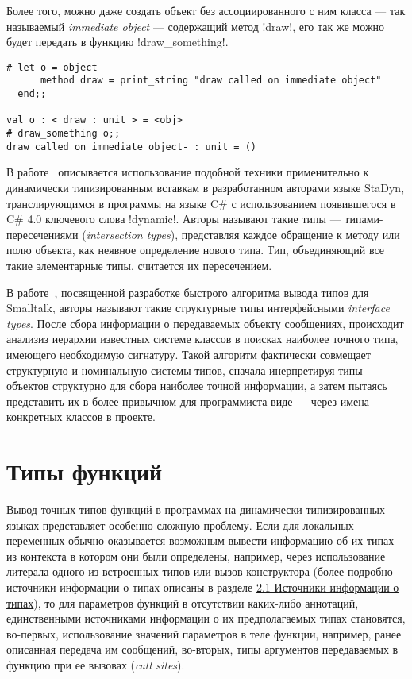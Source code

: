 Более того, можно даже создать объект без ассоциированного с ним класса --- так
называемый \emph{immediate object} --- содержащий метод !draw!, его так
же можно будет передать в функцию !draw_something!.

\begin{lstlisting}
# let o = object
      method draw = print_string "draw called on immediate object"
  end;;

val o : < draw : unit > = <obj>
# draw_something o;;
draw called on immediate object- : unit = ()
\end{lstlisting}
\lstset{language=Python}

В работе~\cite{Ortin2011:union} описывается использование подобной техники
применительно к динамически типизированным вставкам в разработанном авторами
языке StaDyn, транслирующимся в программы на языке C\# с использованием
появившегося в C\# 4.0 ключевого слова !dynamic!.  Авторы называют такие
типы --- типами-пересечениями (\emph{intersection types}), представляя каждое
обращение к методу или полю объекта, как неявное определение нового типа. Тип,
объединяющий все такие элементарные типы, считается их пересечением.

В работе~\cite{Pluquet2009}, посвященной разработке быстрого алгоритма вывода
типов для Smalltalk, авторы называют такие структурные типы интерфейсными 
\emph{interface types}. После сбора информации о передаваемых объекту сообщениях,
происходит анализиз иерархии известных системе классов в поисках наиболее
точного типа, имеющего необходимую сигнатуру. Такой алгоритм фактически
совмещает структурную и номинальную системы типов, сначала инерпретируя типы
объектов структурно для сбора наиболее точной информации, а затем пытаясь
представить их в более привычном для программиста виде --- через имена
конкретных классов в проекте.

\section{Типы функций}

Вывод точных типов функций в программах на динамически типизированных языках
представляет особенно сложную проблему. Если для локальных переменных обычно
оказывается возможным вывести информацию об их типах из контекста в котором они
были определены, например, через использование литерала одного из встроенных
типов или вызов конструктора (более подробно источники информации о типах
описаны в разделе \hyperref[sec:type-sources]{2.1 Источники информации о типах}), то
для параметров функций в отсутствии каких-либо аннотаций, единственными
источниками информации о их предполагаемых типах становятся, во-первых,
использование значений параметров в теле функции, например, ранее описанная
передача им сообщений, во-вторых, типы аргументов передаваемых в функцию при ее
вызовах (\emph{call sites}).

